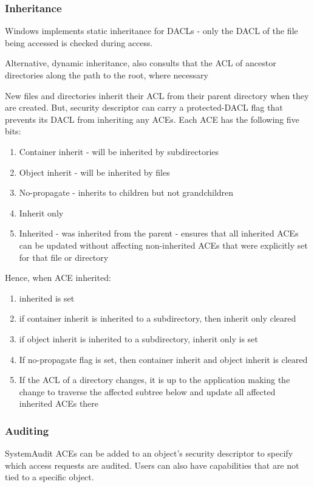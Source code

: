 \documentclass{article}
\newenvironment{cons}{\par\color{red}}{\par}
\begin{document}
\subsubsection{Inheritance}
Windows implements static inheritance for DACLs - only the DACL of the file being accessed is checked during access. 

\begin{cons}
	Alternative, dynamic inheritance, also consults that the ACL of ancestor directories along the path to the root, where necessary
\end{cons}

New files and directories inherit their ACL from their parent directory when they are created. But, security descriptor can carry a protected-DACL flag that prevents its DACL from inheriting any ACEs. Each ACE has the following five bits:
\begin{enumerate}
	\item Container inherit - will be inherited by subdirectories
	\item Object inherit - will be inherited by files
	\item No-propagate - inherits to children but not grandchildren
	\item Inherit only
	\item Inherited - was inherited from the parent - ensures that all inherited ACEs can be updated without affecting non-inherited ACEs that were explicitly set for that file or directory
\end{enumerate}

Hence, when ACE inherited:
\begin{enumerate}
	\item inherited is set
	\item if container inherit is inherited to a subdirectory, then inherit only cleared
	\item if object inherit is inherited to a subdirectory, inherit only is set
	\item If no-propagate flag is set, then container inherit and object inherit is cleared
	\item If the ACL of a directory changes, it is up to the application making the change to traverse the affected subtree below and update all affected inherited ACEs there
\end{enumerate}

\subsubsection{Auditing}
SystemAudit ACEs can be added to an object's security descriptor to specify which access requests are audited. Users can also have capabilities that are not tied to a specific object.
\end{document}

